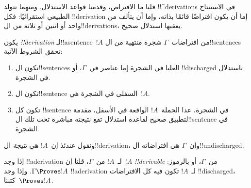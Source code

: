 \documentclass[../../../include/open-logic-section]{subfiles}
\begin{document}
      {}
      {}


\begin{explain}
قلنا ما الافتراض، وقدمنا قواعد الاستدلال. ومنهما تتولد
!!^{derivation}s في الاستنتاج الطبيعي استقرائيًا: فكل !!{derivation}
إما أن يكون افتراضًا قائمًا بذاته، وإما أن يتألف من واحد أو اثنين أو
ثلاثة من ال!!{derivation}s، يعقبها استدلال صحيح.
\end{explain}

\begin{defn}[!!^{derivation}]
يكون  \emph{!!{derivation}} لـ!!a{sentence}~$!A$
من افتراضات~$\Gamma$ شجرة منتهية من ال!!{sentence}s تحقق الشروط الآتية:
\begin{enumerate}
\item تكون ال!!{sentence}s العليا في الشجرة إما عناصر في~$\Gamma$، أو
  !!{discharged} باستدلال في الشجرة.
\item تكون ال!!{sentence} السفلى في الشجرة هي~$!A$.
\item تكون كل !!{sentence} في الشجرة، عدا الجملة~$!A$ الواقعة في
  الأسفل، مقدمة لتطبيق صحيح لقاعدة استدلال تقع نتيجته مباشرة تحت تلك
  ال!!{sentence} في الشجرة.
\end{enumerate}
ونقول عندئذ إن~$!A$ هي \emph{نتيجة} ال!!{derivation}، وإن~$\Gamma$ هي
افتراضاته ال!!{undischarged}.

إذا وجد !!a{derivation} لـ~$!A$ من~$\Gamma$، قلنا إن~$!A$
\emph{!!{derivable}} من~$\Gamma$، أو بالرموز: $\Gamma \Proves !A$.
وإذا وجد !!a{derivation} لـ~$!A$ تكون فيه كل الافتراضات
!!{discharged}، كتبنا~$\Proves !A$.
\end{defn}
\end{document}
